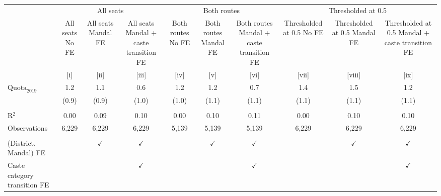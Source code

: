 
\begingroup
\centering
\scriptsize
\begin{adjustbox}{max width=\linewidth}
   \begin{threeparttable}[b]
      \begin{tabular}{lccccccccc}
         \toprule
          & \multicolumn{3}{c}{All seats} & \multicolumn{3}{c}{Both routes} & \multicolumn{3}{c}{Thresholded at 0.5} \\
                                      & All seats No FE & All seats Mandal FE & All seats Mandal + caste transition FE & Both routes No FE & Both routes Mandal FE & Both routes Mandal + caste transition FE & Thresholded at 0.5 No FE & Thresholded at 0.5 Mandal FE & Thresholded at 0.5 Mandal + caste transition FE \\
                                      & [i]             & [ii]                & [iii]                                  & [iv]              & [v]                   & [vi]                                     & [vii]                    & [viii]                       & [ix]\\
         \midrule
         $\text{Quota}_{2019}$        & 1.2             & 1.1                 & 0.6                                    & 1.2               & 1.2                   & 0.7                                      & 1.4                      & 1.5                          & 1.2\\
                                      & (0.9)           & (0.9)               & (1.0)                                  & (1.0)             & (1.1)                 & (1.1)                                    & (1.1)                    & (1.1)                        & (1.1)\\
          \\
         R$^2$                        & 0.00            & 0.09                & 0.10                                   & 0.00              & 0.10                  & 0.11                                     & 0.00                     & 0.10                         & 0.10\\
         Observations                 & 6,229           & 6,229               & 6,229                                  & 5,139             & 5,139                 & 5,139                                    & 6,229                    & 6,229                        & 6,229\\
          \\
         (District, Mandal) FE        &                 & $\checkmark$        & $\checkmark$                           &                   & $\checkmark$          & $\checkmark$                             &                          & $\checkmark$                 & $\checkmark$\\
         Caste category transition FE &                 &                     & $\checkmark$                           &                   &                       & $\checkmark$                             &                          &                              & $\checkmark$\\
         \bottomrule
      \end{tabular}


\end{threeparttable}
\end{adjustbox}
